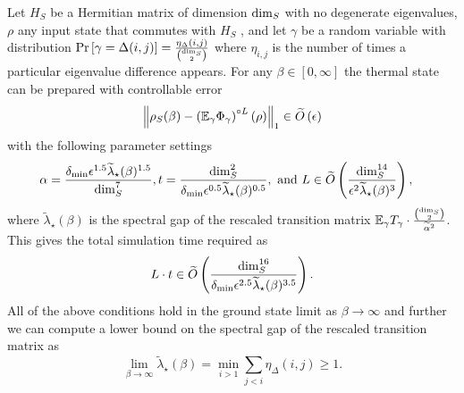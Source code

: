 \begin{theorem} \label{thm:perfect_knowledge}
    Let $H_S$ be a Hermitian matrix of dimension ${\rm dim}_S$ with no degenerate eigenvalues, $\rho$ any input state that commutes with $H_S$ , and let $\gamma$ be a random variable with distribution $\text{Pr}\left[ \gamma = \Delta(i,j) \right] = \frac{\eta_\Delta(i,j)}{\binom{\dim_S}{2}}$ where $\eta_{i,j}$ is the number of times a particular eigenvalue difference appears. For any $\beta\in [0,\infty]$ the thermal state can be prepared with controllable error
    \begin{equation}
        \norm{\rho_S(\beta) - \left(\mathbb{E}_\gamma \Phi_\gamma \right)^{\circ L}(\rho)}_1 \in \widetilde{O} \left( \epsilon \right)
    \end{equation}
     with the following parameter settings
     \begin{align}
         \alpha &= \frac{\delta_{\min} \epsilon^{1.5} \widetilde{\lambda}_\star(\beta)^{1.5}}{\dim_S^7}, t = \frac{\dim_S^2}{\delta_{\min} \epsilon^{0.5} \widetilde{\lambda}_\star(\beta)^{0.5}},\text{ and } L \in \widetilde{O} \left( \frac{\dim_S^{14}}{\epsilon^2 \widetilde{\lambda}_\star(\beta)^3} \right),
     \end{align}
     where $\widetilde{\lambda}_\star(\beta)$ is the spectral gap of the rescaled transition matrix $\mathbb{E}_\gamma T_\gamma  \cdot \frac{\binom{\dim_S}{2}}{\widetilde{\alpha}^2}$. 
     This gives the total simulation time required as
     \begin{equation}
         L \cdot t \in \widetilde{O} \left( \frac{\dim_S^{16}}{\delta_{\min} \epsilon^{2.5} \widetilde{\lambda}_\star(\beta)^{3.5}} \right).
     \end{equation}
     All of the above conditions hold in the ground state limit as $\beta \to \infty$ and further we can compute a lower bound on the spectral gap of the rescaled transition matrix as
     \begin{equation}
         \lim_{\beta \to \infty} \widetilde{\lambda}_\star(\beta) = \min_{i > 1} \sum_{j < i} \eta_\Delta(i,j) \ge 1.
     \end{equation}
\end{theorem}

